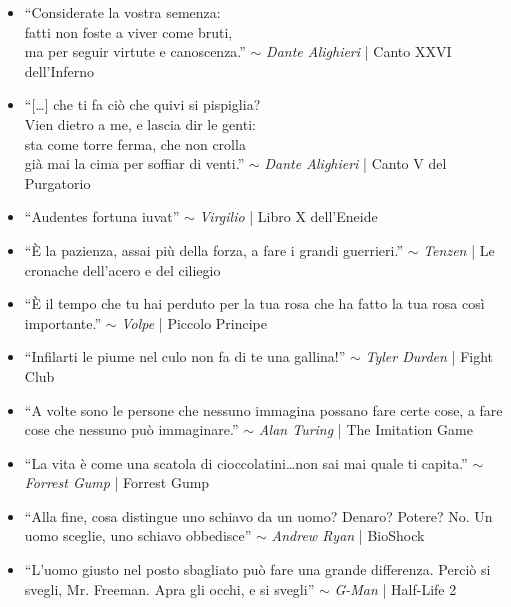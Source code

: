\begin{itemize}

\item ``Considerate la vostra semenza:\\
fatti non foste a viver come bruti,\\
ma per seguir virtute e canoscenza.'' $\sim$ \emph{Dante Alighieri} | Canto XXVI dell'Inferno

\item ``[\dots] che ti fa ciò che quivi si pispiglia?\\
Vien dietro a me, e lascia dir le genti:\\
sta come torre ferma, che non crolla\\
già mai la cima per soffiar di venti.'' $\sim$ \emph{Dante Alighieri} | Canto V
del Purgatorio

\item ``Audentes fortuna iuvat'' $\sim$ \emph{Virgilio} | Libro X dell'Eneide

\item ``È la pazienza, assai più della forza, a fare i grandi
guerrieri.'' $\sim$ \emph{Tenzen} | Le cronache dell'acero e del
ciliegio

\item ``È il tempo che tu hai perduto per la tua rosa che ha fatto la
tua rosa così importante.'' $\sim$ \emph{Volpe} | Piccolo Principe

\item ``Infilarti le piume nel culo non fa di te una gallina!'' $\sim$
\emph{Tyler Durden} | Fight Club

\item ``A volte sono le persone che nessuno immagina possano fare certe
cose, a fare cose che nessuno può immaginare.'' $\sim$ \emph{Alan Turing} |
The Imitation Game

\item ``La vita è come una scatola di cioccolatini\dots non sai mai quale ti capita.'' $\sim$ \emph{Forrest Gump} | Forrest Gump

\item ``Alla fine, cosa distingue uno schiavo da un uomo?
Denaro? Potere? No. Un uomo sceglie, uno schiavo obbedisce'' $\sim$
\emph{Andrew Ryan} | BioShock

\item ``L'uomo giusto nel posto sbagliato può fare una grande
differenza. Perciò si svegli, Mr. Freeman. Apra gli occhi, e si
svegli'' $\sim$ \emph{G-Man} | Half-Life 2

\end{itemize}
